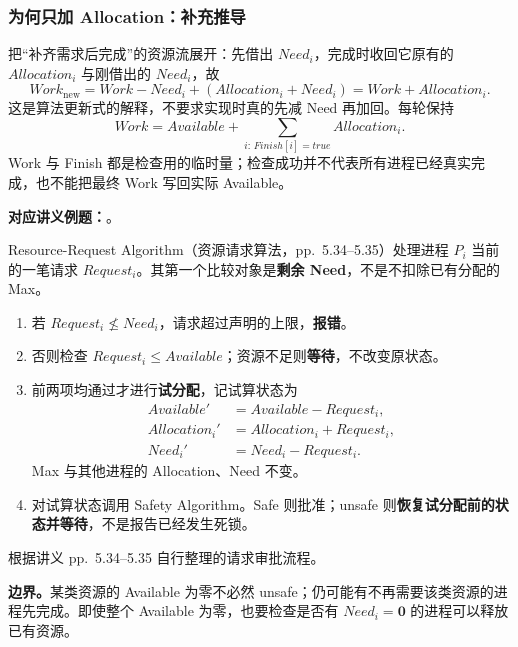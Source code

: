 \subsubsection{为何只加 Allocation：补充推导}

把“补齐需求后完成”的资源流展开：先借出 $Need_i$，完成时收回它原有的 $Allocation_i$ 与刚借出的 $Need_i$，故
\[
  Work_{\mathrm{new}}
  =Work-Need_i+(Allocation_i+Need_i)
  =\boxed{Work+Allocation_i}.
\]
这是算法更新式的解释，不要求实现时真的先减 Need 再加回。每轮保持
\[
  Work=Available+\sum_{i:\,Finish[i]=true}Allocation_i.
\]
Work 与 Finish 都是检查用的临时量；检查成功并不代表所有进程已经真实完成，也不能把最终 Work 写回实际 Available。

\textbf{对应讲义例题：}。


Resource-Request Algorithm（资源请求算法，pp.~5.34--5.35）处理进程 $P_i$ 当前的一笔请求 $Request_i$。其第一个比较对象是\textbf{剩余 Need}，不是不扣除已有分配的 Max。

\begin{enumerate}
  \item 若 $Request_i\nleq Need_i$，请求超过声明的上限，\textbf{报错}。
  \item 否则检查 $Request_i\le Available$；资源不足则\textbf{等待}，不改变原状态。
  \item 前两项均通过才进行\textbf{试分配}，记试算状态为
  \[
    \begin{aligned}
      Available'&=Available-Request_i,\\
      Allocation_i'&=Allocation_i+Request_i,\\
      Need_i'&=Need_i-Request_i.
    \end{aligned}
  \]
  Max 与其他进程的 Allocation、Need 不变。
  \item 对试算状态调用 Safety Algorithm。Safe 则批准；unsafe 则\textbf{恢复试分配前的状态并等待}，不是报告已经发生死锁。
\end{enumerate}

\begin{center}
  
  \par\small 根据讲义 pp.~5.34--5.35 自行整理的请求审批流程。
\end{center}

\textbf{边界。}某类资源的 Available 为零不必然 unsafe；仍可能有不再需要该类资源的进程先完成。即使整个 Available 为零，也要检查是否有 $Need_i=\mathbf0$ 的进程可以释放已有资源。


